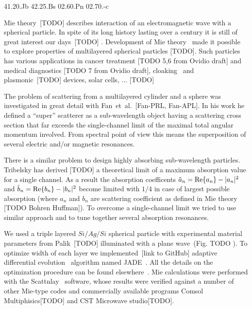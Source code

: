 \documentclass[aps,prl,twocolumn,showpacs,superscriptaddress,groupedaddress]{revtex4-1}
\begin{document}
\pacs%
{41.20.Jb 42.25.Bs 02.60.Pn 02.70.-c}

\maketitle %

Mie theory~[TODO] describes interaction of an electromagnetic wave with a
spherical particle.  In spite of its long history lasting over a
century it is still of great interest our days~[TODO] .  Development of
Mie theory~\cite{Yang-2003, Pena-scattnlay-2009} made it possible to
explore properties of multilayered spherical particles [TODO]. Such particles
has various applications in cancer treatment [TODO 5,6 from Ovidio draft]
and medical diagnostics [TODO 7 from Ovidio draft],
cloaking~\cite{Semouchkina-2013, Ladutenko-2014} and  plasmonic~[TODO] devices, solar
cells, ... [TODO]

The problem of scattering from a multilayered cylinder and a sphere
was investigated in great detail with Fan~et~al.~[Fan-PRL, Fan-APL].
In his work he defined a ``super'' scatterer as a sub-wavelength object
having a scattering cross section that far exceeds the single-channel
limit of the maximal total angular momentum involved.  From spectral
point of view this means the superposition of several electric and/or
magnetic resonances.

There is a similar problem to design highly absorbing sub-wavelength
particles.  Tribelsky has derived [TODO] a theoretical limit of a
maximum absorption value for a single channel.  As a result the
absorption coefficents $\tilde{a}_n= {\rm Re}\{a_n\} - |a_n|^2 $ and
$\tilde{b}_n= {\rm Re}\{b_n\} - |b_n|^2 $ become limited with $1/4$ in
case of largest possible absorption (where $a_n$ and $b_n$ are
scattering coefficient as defined in Mie theory [TODO Bohren
Huffman]).  To overcome a single-channel limit we tried to use similar
approach and to tune together several absorption resonances.

We used a triple layered $Si/Ag/Si$ spherical particle with
experimental material parameters from Palik~[TODO] illuminated with a
plane wave~(Fig. TODO ).  To optimize width of each layer we
implemented~[link to GitHub] adaptive differential
evolution~\cite{Storn-DE-first-1997} algorithm named
JADE~\cite{Jingqiao-JADE-2009}.  All the details on the optimization
procedure can be found elsewhere~\cite{Ladutenko-2014}.  Mie
calculations were performed with the
Scattnlay~\cite{Pena-scattnlay-2009} software, whose results were verified
against a number of other Mie-type codes and commercially available
programs Comsol Multiphisics[TODO] and CST Microwave studio[TODO].
\end{document}

